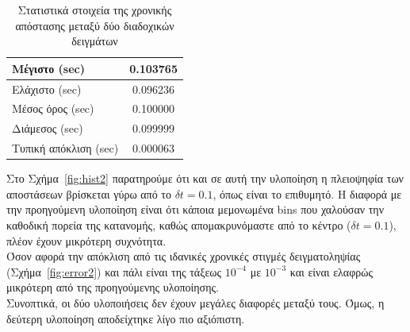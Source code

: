 \documentclass[a4paper,12pt]{article}
\begin{document}
\begin{table}
	\centering
	\begin{tabular}{ ||p{4cm}|c|| }
		\hline
		Μέγιστο \textlatin{(sec)} & 0.103765 \\
		\hline
		Ελάχιστο \textlatin{(sec)} & 0.096236 \\
		\hline
		Μέσος όρος \textlatin{(sec)} & 0.100000 \\
		\hline
		Διάμεσος \textlatin{(sec)} & 0.099999 \\
		\hline
		Τυπική απόκλιση \textlatin{(sec)} & 0.000063 \\
		\hline
	\end{tabular}
	\caption{Στατιστικά στοιχεία της χρονικής απόστασης μεταξύ δύο διαδοχικών δειγμάτων}\label{tab:stats2}
\end{table}
Στο Σχήμα~\ref{fig:hist2} παρατηρούμε ότι και σε αυτή την υλοποίηση η πλειοψηφία των αποστάσεων βρίσκεται γύρω από το $\delta t = 0.1$, όπως είναι το επιθυμητό. Η διαφορά με την προηγούμενη υλοποίηση είναι ότι κάποια μεμονωμένα \textlatin{bins} που χαλούσαν την καθοδική πορεία της κατανομής, καθώς απομακρυνόμαστε από το κέντρο ($\delta t = 0.1$), πλέον έχουν μικρότερη συχνότητα. \\
Όσον αφορά την απόκλιση από τις ιδανικές χρονικές στιγμές δειγματοληψίας (Σχήμα~\ref{fig:error2}) και πάλι είναι της τάξεως $10^{-4}$ με $10^{-3}$ και είναι ελαφρώς μικρότερη από της προηγούμενης υλοποίησης. \\
Συνοπτικά, οι δύο υλοποιήσεις δεν έχουν μεγάλες διαφορές μεταξύ τους. Όμως, η δεύτερη υλοποίηση αποδείχτηκε λίγο πιο αξιόπιστη. 
\end{document}
